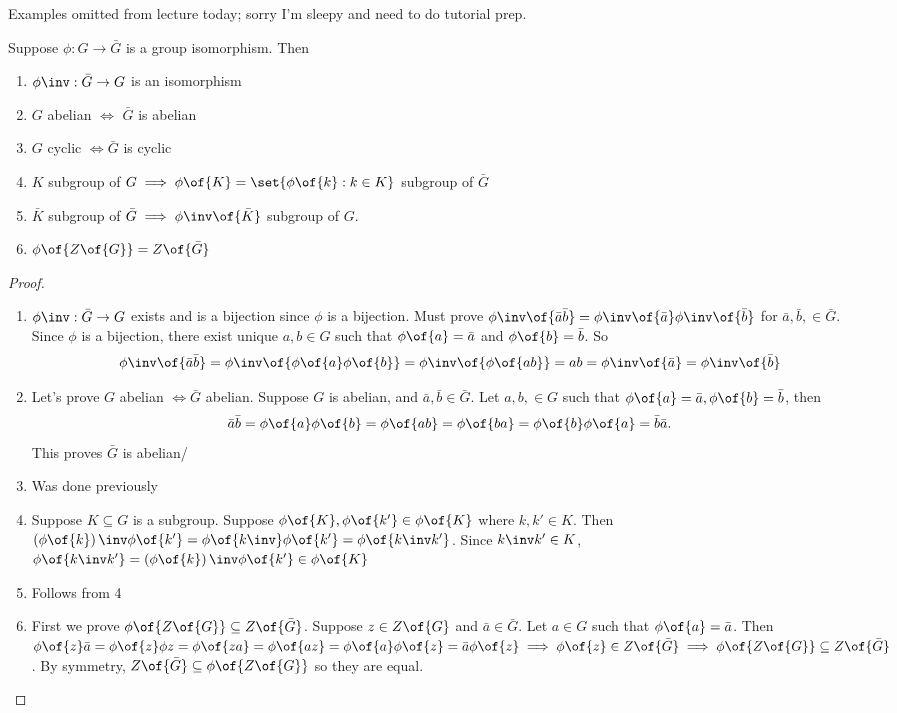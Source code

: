 \begin{note}
Examples omitted from lecture today; sorry I'm sleepy and need to do tutorial prep.
\end{note}

\begin{theorem}
    Suppose $\phi: G \to \bar{G}$ is a group isomorphism. Then \begin{enumerate}
        \item $\phi\inv: \bar{G} \to G$ is an isomorphism
        \item $G$ abelian $\iff$ $\bar{G}$ is abelian
        \item $G$ cyclic $\iff \bar{G}$ is cyclic
        \item $K$ subgroup of $G \implies \phi\of{K} = \set{\phi\of{k}: k \in K}$ subgroup of $\bar{G}$
        \item $\bar{K}$ subgroup of $\bar{G} \implies \phi\inv\of{\bar{K}}$ subgroup of $G$. 
        \item $\phi\of{Z\of{G}} = Z\of{\bar{G}}$
    \end{enumerate}
\end{theorem}
\begin{proof}
    \begin{enumerate}
        \item $\phi\inv: \bar{G} \to G$ exists and is a bijection since $\phi$ is a bijection. Must prove $\phi\inv\of{\bar{a}\bar{b}} = \phi\inv\of{\bar{a}} \phi\inv\of{\bar{b}}$ for $\bar{a},\bar{b}, \in \bar{G}$. Since $\phi$ is a bijection, there exist unique $a,b \in G$ such that $\phi\of{a} = \bar{a}$ and $\phi\of{b} = \bar{b}$. So \[\phi\inv\of{\bar{a}\bar{b}} = \phi\inv\of{\phi\of{a}\phi\of{b}} = \phi\inv\of{\phi\of{ab}} = ab = \phi\inv\of{\bar{a}} = \phi\inv\of{\bar{b}}\]
        \item Let's prove $G$ abelian $\iff \bar{G}$ abelian. Suppose $G$ is abelian, and $\bar{a},\bar{b} \in \bar{G}$. Let $a,b, \in G$ such that $\phi\of{a} = \bar{a}, \phi\of{b} = \bar{b}$, then \[\bar{a}\bar{b} = \phi\of{a} \phi\of{b} = \phi\of{ab} = \phi\of{ba} = \phi\of{b} \phi\of{a} = \bar{b}\bar{a}.\] This proves $\bar{G}$ is abelian/
        \item Was done previously
        \item Suppose $K \subseteq G$ is a subgroup. Suppose $\phi\of{K}, \phi\of{k'} \in \phi\of{K}$ where $k, k' \in K$. Then $\left(\phi\of{k}\right)\inv \phi\of{k'} = \phi\of{k\inv} \phi\of{k'} = \phi\of{k\inv k'}$. Since $k\inv k' \in K$, $\phi\of{k\inv k'} = \left(\phi\of{k}\right)\inv \phi\of{k'} \in \phi\of{K}$
        \item Follows from 4
        \item First we prove $\phi\of{Z\of{G}} \subseteq Z\of{\bar{G}}$. Suppose $z \in Z\of{G}$ and $\bar{a} \in \bar{G}$. Let $a \in G$ such that $\phi\of{a} = \bar{a}$. Then $\phi\of{z} \bar{a} = \phi\of{z}\phi{z} = \phi\of{za} = \phi\of{az} = \phi\of{a} \phi\of{z} = \bar{a} \phi\of{z} \implies \phi\of{z} \in Z\of{\bar{G}} \implies \phi\of{Z\of{G}} \subseteq Z\of{\bar{G}}$. By symmetry, $Z\of{\bar{G}} \subseteq \phi\of{Z\of{G}}$ so they are equal.
    \end{enumerate}
\end{proof}

